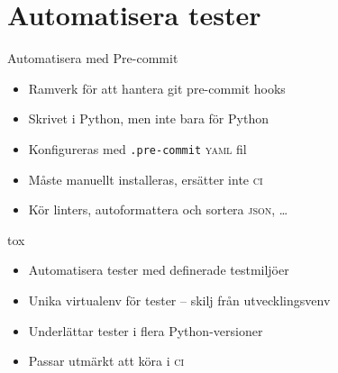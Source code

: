 \section{Automatisera tester}

\begin{frame}{Automatisera med Pre-commit}
  \begin{itemize}
    \item Ramverk för att hantera git pre-commit hooks
    \item Skrivet i Python, men inte bara för Python
    \item Konfigureras med \texttt{.pre-commit} \textsc{yaml} fil
    \item Måste manuellt installeras, ersätter inte \textsc{ci}
    \item Kör linters, autoformattera och sortera \textsc{json}, …
  \end{itemize}
\end{frame}



\begin{frame}{tox}
  \begin{itemize}
    \item Automatisera tester med definerade testmiljöer
    \item Unika virtualenv för tester -- skilj från utvecklingsvenv
    \item Underlättar tester i flera Python-versioner
    \item Passar utmärkt att köra i \textsc{ci}
  \end{itemize}

\end{frame}
